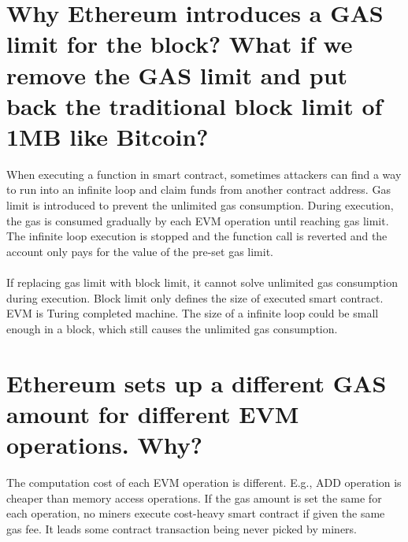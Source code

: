\documentclass{article}
\begin{document}
\section{Why Ethereum introduces a GAS limit for the block? What if we remove the GAS
limit and put back the traditional block limit of 1MB like Bitcoin?}
When executing a function in smart contract, sometimes attackers can find a way to run into an infinite
loop and claim funds from another contract address. Gas limit is introduced to prevent the unlimited gas consumption.
During execution, the gas is consumed gradually by each EVM operation until reaching gas limit. 
The infinite loop execution is stopped and the function call is reverted and the account only pays for
the value of the pre-set gas limit.\\\\
If replacing gas limit with block limit, it cannot solve unlimited gas consumption during execution.
Block limit only defines the size of executed smart contract. EVM is Turing completed machine. The size of a infinite loop could be small enough in a block, which still causes the unlimited gas consumption.
\section{Ethereum sets up a different GAS amount for different EVM operations. Why?}
The computation cost of each EVM operation is different. E.g., ADD operation is cheaper than memory access operations. If the gas amount is set the same for each operation, no miners execute cost-heavy smart contract if given the same gas fee. It leads some contract transaction being never picked by miners.
\end{document}
